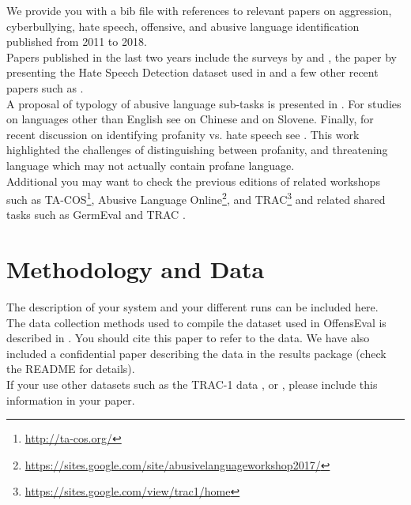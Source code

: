 \documentclass[11pt,a4paper]{article}
\begin{document}
We provide you with a bib file with references to relevant papers on  aggression, cyberbullying, hate speech, offensive, and abusive language identification published from 2011 to 2018.
\\

Papers published in the last two years include the surveys by \cite{schmidt2017survey} and \cite{fortuna2018survey}, the paper by \cite{davidson2017automated} presenting the Hate Speech Detection dataset used in \cite{malmasi2017detecting} and a few other recent papers such as \cite{elsherief2018hate,gamback2017using,zhang2018detecting}.\\ 

A proposal of typology of abusive language sub-tasks is presented in \cite{waseem2017understanding}. For studies on languages other than English see \cite{su2017} on Chinese and \cite{fiser2017} on Slovene. Finally, for recent discussion on identifying profanity vs. hate speech see \cite{malmasi2018challenges}. This work highlighted the challenges of distinguishing between profanity, and threatening language which may not actually contain profane language.\\

Additional you may want to check the previous editions of related workshops such as TA-COS\footnote{\url{http://ta-cos.org/}}, Abusive Language Online\footnote{\url{https://sites.google.com/site/abusivelanguageworkshop2017/}}, and TRAC\footnote{\url{https://sites.google.com/view/trac1/home}} and related shared tasks such as GermEval \cite{wiegand2018overview} and TRAC \cite{trac2018report}.

\section{Methodology and Data}

The description of your system and your different runs can be included here.
\\

The data collection methods used to compile the dataset used in OffensEval is described in .
You should cite this paper to refer to the data.
We have also included a confidential paper describing the data in the results package (check the README for details).\\

If your use other datasets such as the TRAC-1 data \cite{trac2018report}, or \cite{davidson2017automated}, please include this information in your paper. 
\end{document}
